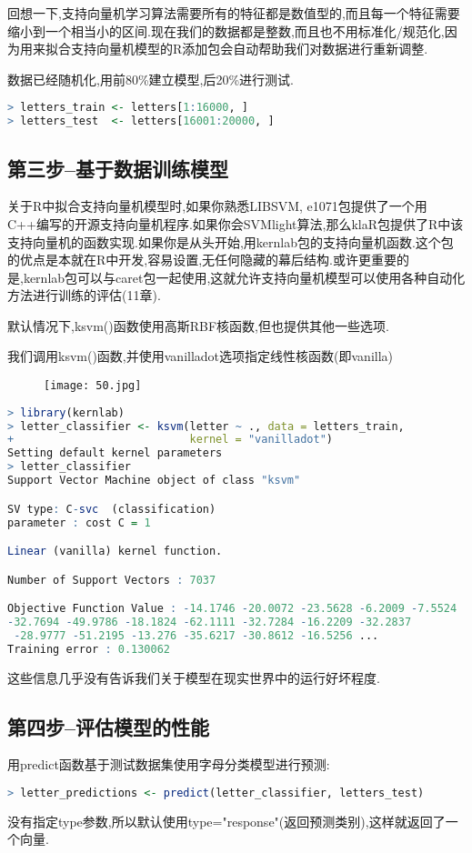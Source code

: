 \documentclass[11pt,a4paper,oneside]{book}
\begin{document}
回想一下,支持向量机学习算法需要所有的特征都是数值型的,而且每一个特征需要缩小到一个相当小的区间.现在我们的数据都是整数,而且也不用标准化/规范化,因为用来拟合支持向量机模型的R添加包会自动帮助我们对数据进行重新调整.

数据已经随机化,用前80\%建立模型,后20\%进行测试.
\begin{lstlisting}[language=r]
> letters_train <- letters[1:16000, ]
> letters_test  <- letters[16001:20000, ]
\end{lstlisting}

\subsection{第三步--基于数据训练模型}
关于R中拟合支持向量机模型时,如果你熟悉LIBSVM, e1071包提供了一个用C++编写的开源支持向量机程序.如果你会SVMlight算法,那么klaR包提供了R中该支持向量机的函数实现.如果你是从头开始,用kernlab包的支持向量机函数.这个包的优点是本就在R中开发,容易设置,无任何隐藏的幕后结构.或许更重要的是,kernlab包可以与caret包一起使用,这就允许支持向量机模型可以使用各种自动化方法进行训练的评估(11章).

默认情况下,ksvm()函数使用高斯RBF核函数,但也提供其他一些选项.

我们调用ksvm()函数,并使用vanilladot选项指定线性核函数(即vanilla)
\begin{figure}[H]
	\centering
	\texttt{[image: 50.jpg]}
\end{figure}



\begin{lstlisting}[language=r]
> library(kernlab)
> letter_classifier <- ksvm(letter ~ ., data = letters_train,
+                           kernel = "vanilladot")
Setting default kernel parameters  
> letter_classifier
Support Vector Machine object of class "ksvm" 

SV type: C-svc  (classification) 
parameter : cost C = 1 

Linear (vanilla) kernel function. 

Number of Support Vectors : 7037 

Objective Function Value : -14.1746 -20.0072 -23.5628 -6.2009 -7.5524 
-32.7694 -49.9786 -18.1824 -62.1111 -32.7284 -16.2209 -32.2837
 -28.9777 -51.2195 -13.276 -35.6217 -30.8612 -16.5256 ...
Training error : 0.130062 
\end{lstlisting}
这些信息几乎没有告诉我们关于模型在现实世界中的运行好坏程度.
\subsection{第四步--评估模型的性能}
用predict函数基于测试数据集使用字母分类模型进行预测:
\begin{lstlisting}[language=r]
> letter_predictions <- predict(letter_classifier, letters_test)
\end{lstlisting}
没有指定type参数,所以默认使用type="response"(返回预测类别),这样就返回了一个向量.
\end{document}
